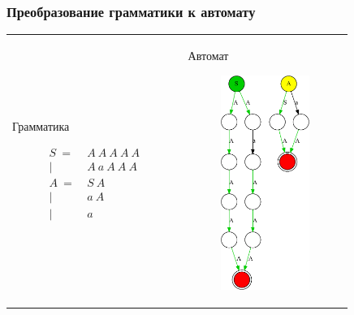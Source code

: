 \documentclass{beamer}
\begin{document}
    \begin{frame}
        \frametitle{Преобразование грамматики к автомату}
        \begin{tabular}{p{5cm} p{4cm}}
            Грамматика
            \begin{figure}[t]
                {$\!\begin{aligned}
                    S\ =&\ A\ A\ A\ A\ A \\
                       |&\ A\ a\ A\ A\ A \\
                    A\ =&\ S\ A \\
                       |&\ a\ A \\
                       |&\ a
                    \end{aligned}$}
            \end{figure}
            &
            Автомат
            \begin{figure}[t]
                \centering
                \includegraphics[height=7cm]{pictures/initialNFA.pdf}
            \end{figure}
        \end{tabular}
    \end{frame}
\end{document}
